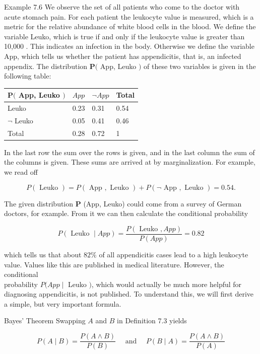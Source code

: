 \documentclass[10pt]{book}
\begin{document}
Example 7.6 We observe the set of all patients who come to the doctor with acute stomach pain. For each patient the leukocyte value is measured, which is a metric for the relative abundance of white blood cells in the blood. We define the variable Leuko, which is true if and only if the leukocyte value is greater than 10,000 . This indicates an infection in the body. Otherwise we define the variable App, which tells us whether the patient has appendicitis, that is, an infected appendix. The distribution $\boldsymbol{P}($ App, Leuko $)$ of these two variables is given in the following table:

\begin{center}
\begin{tabular}{llll}
\hline
$\boldsymbol{P}($ App, Leuko $)$ & $A p p$ & $\neg A p p$ & Total \\
\hline
Leuko & 0.23 & 0.31 & 0.54 \\
\hline
$\neg$ Leuko & 0.05 & 0.41 & 0.46 \\
\hline
Total & 0.28 & 0.72 & 1 \\
\hline
\end{tabular}
\end{center}

In the last row the sum over the rows is given, and in the last column the sum of the columns is given. These sums are arrived at by marginalization. For example, we read off

$$
P(\text { Leuko })=P(\text { App }, \text { Leuko })+P(\neg \text { App }, \text { Leuko })=0.54 .
$$

The given distribution $\boldsymbol{P}$ (App, Leuko) could come from a survey of German doctors, for example. From it we can then calculate the conditional probability

$$
P(\text { Leuko } \mid A p p)=\frac{P(\text { Leuko }, A p p)}{P(A p p)}=0.82
$$

which tells us that about $82 \%$ of all appendicitis cases lead to a high leukocyte value. Values like this are published in medical literature. However, the conditional\\
probability $P(A p p \mid$ Leuko $)$, which would actually be much more helpful for diagnosing appendicitis, is not published. To understand this, we will first derive a simple, but very important formula.

Bayes' Theorem
Swapping $A$ and $B$ in Definition 7.3 yields

$$
P(A \mid B)=\frac{P(A \wedge B)}{P(B)} \quad \text { and } \quad P(B \mid A)=\frac{P(A \wedge B)}{P(A)}
$$
\end{document}

